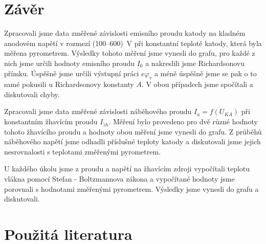 \documentclass[english]{article}
\begin{document}
\section{Závěr}
	Zpracovali jsme data změřené závislosti emisního proudu katody na kladném anodovém napětí v rozmezí (100--600)~V při konstantní teplotě katody, která byla měřena pyrometrem. Výsledky tohoto měření jsme vynesli do grafu, pro každé z nich jsme určili hodnoty emisního proudu $I_0$ a nakreslili jsme Richardsonovu přímku. Úspěšně jsme určili výstupní práci $e\varphi_v$ a méně úspěšně jsme se pak o to samé pokusili u Richardsonovy konstanty $A$. V obou případech jsme spočítali a diskutovali chyby.   
	
	Zpracovali jsme data změřené závislosti náběhového proudu $I_a = f(U_{KA})$ při konstantním žhavícím proudu $I_{\check{z}h}$. Měření bylo provedeno pro dvě různé hodnoty tohoto žhavícího proudu a hodnoty obou měření jsme vynesli do grafu. Z průběhů náběhového napětí jsme odhadli příslušné teploty katody a diskutovali jsme jejich nesrovnalosti s teplotami změřenými pyrometrem. 
	
	U každého úkolu jsme z proudu a napětí na žhavícím zdroji vypočítali teplotu vlákna pomocí Stefan - Boltzmannova zákona a vypočítané hodnoty jsme porovnali s hodnotami změřenými pyrometrem. Výsledky jsme vynesli do grafu a diskutovali.

\section {Použitá literatura}
\begingroup
\renewcommand{\section}[2]{}
\end{document}
